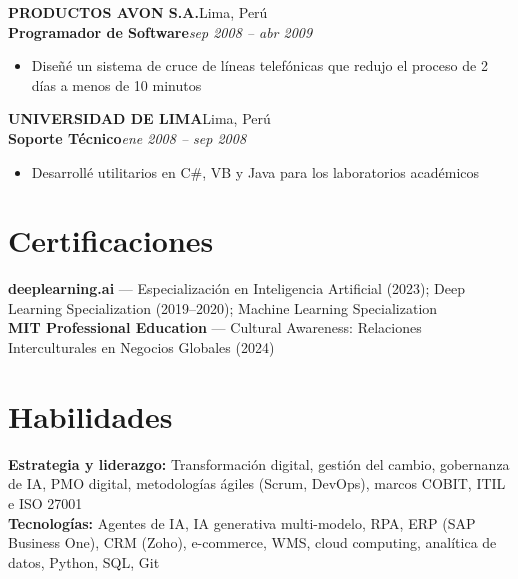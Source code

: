 \documentclass[10pt,letterpaper]{article}
\newcommand{\role}[2]{\textbf{#1}\hfill\textit{#2}\\[-2pt]}
\newcommand{\employer}[2]{\textbf{#1}\hfill #2\\[-1pt]}
\begin{document}
\vspace{3pt}
\employer{PRODUCTOS AVON S.A.}{Lima, Perú}
\role{Programador de Software}{sep 2008 -- abr 2009}
\begin{itemize}[leftmargin=1.4em, nosep]
  \item Diseñé un sistema de cruce de líneas telefónicas que redujo el proceso de 2 días a menos de 10 minutos
\end{itemize}

\vspace{3pt}
\employer{UNIVERSIDAD DE LIMA}{Lima, Perú}
\role{Soporte Técnico}{ene 2008 -- sep 2008}
\begin{itemize}[leftmargin=1.4em, nosep]
  \item Desarrollé utilitarios en C\#, VB y Java para los laboratorios académicos
\end{itemize}

\section{Certificaciones}
\textbf{deeplearning.ai} --- Especialización en Inteligencia Artificial (2023); Deep Learning Specialization (2019--2020); Machine Learning Specialization\\[1pt]
\textbf{MIT Professional Education} --- Cultural Awareness: Relaciones Interculturales en Negocios Globales (2024)

\section{Habilidades}
\textbf{Estrategia y liderazgo:} Transformación digital, gestión del cambio, gobernanza de IA, PMO digital, metodologías ágiles (Scrum, DevOps), marcos COBIT, ITIL e ISO 27001\\[1pt]
\textbf{Tecnologías:} Agentes de IA, IA generativa multi-modelo, RPA, ERP (SAP Business One), CRM (Zoho), e-commerce, WMS, cloud computing, analítica de datos, Python, SQL, Git
\end{document}
